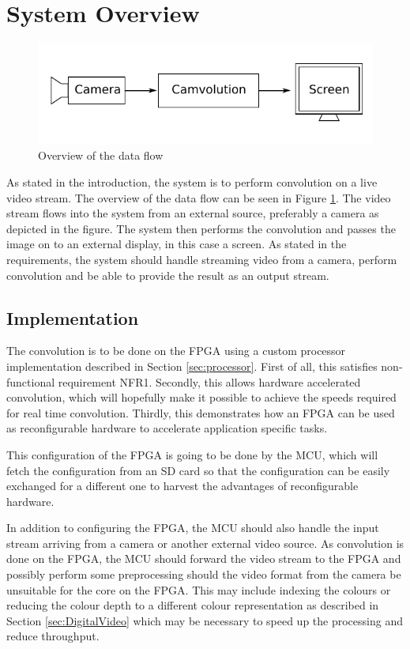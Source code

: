 \section{System Overview}


\begin{figure}[h]
    \centering
    \includegraphics{img/SystemOverview.pdf}
    \caption{Overview of the data flow}
    \label{fig:SystemOverview}
\end{figure}

As stated in the introduction, the system is to perform convolution on a live video stream.
The overview of the data flow can be seen in Figure \ref{fig:SystemOverview}.
The video stream flows into the system from an external source, preferably a camera as depicted in the figure.
The system then performs the convolution and passes the image on to an external display, in this case a screen.
As stated in the requirements, the system should handle streaming video from a camera, perform convolution and be able to provide the result as an output stream.

\subsection{Implementation}
The convolution is to be done on the FPGA using a custom processor implementation described in Section \ref{sec:processor}.
First of all, this satisfies non-functional requirement NFR1.
Secondly, this allows hardware accelerated convolution, which will hopefully make it possible to achieve the speeds required for real time convolution.
Thirdly, this demonstrates how an FPGA can be used as reconfigurable hardware to accelerate application specific tasks.

This configuration of the FPGA is going to be done by the MCU, which will fetch the configuration from an SD card so that the configuration can be easily exchanged for a different one to harvest the advantages of reconfigurable hardware.

In addition to configuring the FPGA, the MCU should also handle the input stream arriving from a camera or another external video source.
As convolution is done on the FPGA, the MCU should forward the video stream to the FPGA and possibly perform some preprocessing should the video format from the camera be unsuitable for the core on the FPGA.
This may include indexing the colours or reducing the colour depth to a different colour representation as described in Section \ref{sec:DigitalVideo} which may be necessary to speed up the processing and reduce throughput.


